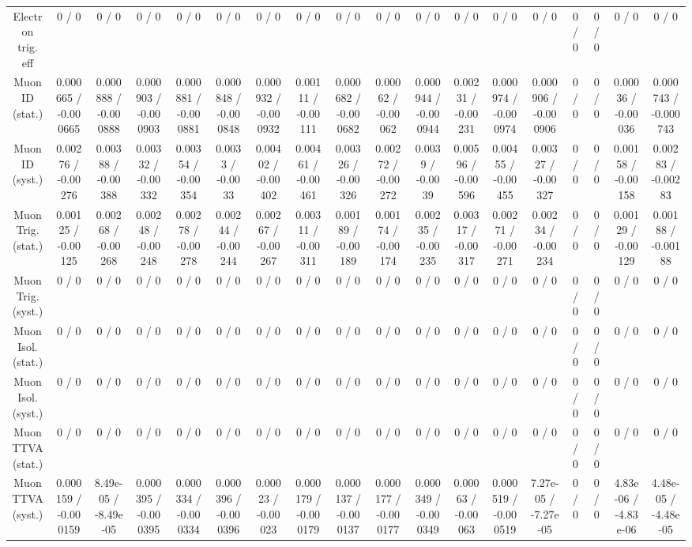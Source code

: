 \documentclass[10pt]{article}
\begin{document}
\begin{table}[htbp]
\begin{center}
\begin{tabular}{|c|c|c|c|c|c|c|c|c|c|c|c|c|c|c|c|c|c|}
  Electron trig. eff & 0 / 0 & 0 / 0 & 0 / 0 & 0 / 0 & 0 / 0 & 0 / 0 & 0 / 0 & 0 / 0 & 0 / 0 & 0 / 0 & 0 / 0 & 0 / 0 & 0 / 0 & 0 / 0 & 0 / 0 & 0 / 0 & 0 / 0 \\ 
  Muon ID (stat.) & 0.000665 / -0.000665 & 0.000888 / -0.000888 & 0.000903 / -0.000903 & 0.000881 / -0.000881 & 0.000848 / -0.000848 & 0.000932 / -0.000932 & 0.00111 / -0.00111 & 0.000682 / -0.000682 & 0.00062 / -0.00062 & 0.000944 / -0.000944 & 0.00231 / -0.00231 & 0.000974 / -0.000974 & 0.000906 / -0.000906 & 0 / 0 & 0 / 0 & 0.00036 / -0.00036 & 0.000743 / -0.000743 \\ 
  Muon ID (syst.) & 0.00276 / -0.00276 & 0.00388 / -0.00388 & 0.00332 / -0.00332 & 0.00354 / -0.00354 & 0.0033 / -0.0033 & 0.00402 / -0.00402 & 0.00461 / -0.00461 & 0.00326 / -0.00326 & 0.00272 / -0.00272 & 0.0039 / -0.0039 & 0.00596 / -0.00596 & 0.00455 / -0.00455 & 0.00327 / -0.00327 & 0 / 0 & 0 / 0 & 0.00158 / -0.00158 & 0.00283 / -0.00283 \\ 
  Muon Trig. (stat.) & 0.00125 / -0.00125 & 0.00268 / -0.00268 & 0.00248 / -0.00248 & 0.00278 / -0.00278 & 0.00244 / -0.00244 & 0.00267 / -0.00267 & 0.00311 / -0.00311 & 0.00189 / -0.00189 & 0.00174 / -0.00174 & 0.00235 / -0.00235 & 0.00317 / -0.00317 & 0.00271 / -0.00271 & 0.00234 / -0.00234 & 0 / 0 & 0 / 0 & 0.00129 / -0.00129 & 0.00188 / -0.00188 \\ 
  Muon Trig. (syst.) & 0 / 0 & 0 / 0 & 0 / 0 & 0 / 0 & 0 / 0 & 0 / 0 & 0 / 0 & 0 / 0 & 0 / 0 & 0 / 0 & 0 / 0 & 0 / 0 & 0 / 0 & 0 / 0 & 0 / 0 & 0 / 0 & 0 / 0 \\ 
  Muon Isol. (stat.) & 0 / 0 & 0 / 0 & 0 / 0 & 0 / 0 & 0 / 0 & 0 / 0 & 0 / 0 & 0 / 0 & 0 / 0 & 0 / 0 & 0 / 0 & 0 / 0 & 0 / 0 & 0 / 0 & 0 / 0 & 0 / 0 & 0 / 0 \\ 
  Muon Isol. (syst.) & 0 / 0 & 0 / 0 & 0 / 0 & 0 / 0 & 0 / 0 & 0 / 0 & 0 / 0 & 0 / 0 & 0 / 0 & 0 / 0 & 0 / 0 & 0 / 0 & 0 / 0 & 0 / 0 & 0 / 0 & 0 / 0 & 0 / 0 \\ 
  Muon TTVA (stat.) & 0 / 0 & 0 / 0 & 0 / 0 & 0 / 0 & 0 / 0 & 0 / 0 & 0 / 0 & 0 / 0 & 0 / 0 & 0 / 0 & 0 / 0 & 0 / 0 & 0 / 0 & 0 / 0 & 0 / 0 & 0 / 0 & 0 / 0 \\ 
  Muon TTVA (syst.) & 0.000159 / -0.000159 & 8.49e-05 / -8.49e-05 & 0.000395 / -0.000395 & 0.000334 / -0.000334 & 0.000396 / -0.000396 & 0.00023 / -0.00023 & 0.000179 / -0.000179 & 0.000137 / -0.000137 & 0.000177 / -0.000177 & 0.000349 / -0.000349 & 0.00063 / -0.00063 & 0.000519 / -0.000519 & 7.27e-05 / -7.27e-05 & 0 / 0 & 0 / 0 & 4.83e-06 / -4.83e-06 & 4.48e-05 / -4.48e-05 \\ 

\end{tabular}
\end{center}
\end{table}
\end{document}
